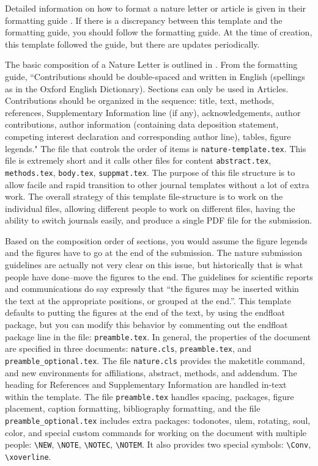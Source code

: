 

Detailed information on how to format a nature letter or article is given in their formatting guide \cite{gta}. If there is a discrepancy between this template and the formatting guide, you should follow the formatting guide. At the time of creation, this template followed the guide, but there are updates periodically. 

The basic composition of a Nature Letter is outlined in \cite{nat_compo}. From the formatting guide\cite{gta}, ``Contributions should be double-spaced and written in English (spellings as in the Oxford English Dictionary). Sections can only be used in Articles. Contributions should be organized in the sequence: title, text, methods, references, Supplementary Information line (if any), acknowledgements, author contributions, author information (containing data deposition statement, competing interest declaration and corresponding author line), tables, figure legends." The file that controls the order of items is \verb!nature-template.tex!. This file is extremely short and it calls other files for content \verb!abstract.tex!, \verb!methods.tex!, \verb!body.tex!, \verb!suppmat.tex!. The purpose of this file structure is to allow facile and rapid transition to other journal templates without a lot of extra work. The overall strategy of this template file-structure is to work on the individual files, allowing different people to work on different files, having the ability to switch journals easily, and produce a single PDF file for the submission.

Based on the composition order of sections, you would assume the figure legends and the figures have to go at the end of the submission. The nature submission guidelines are actually not very clear on this issue, but historically that is what people have done--move the figures to the end. The guidelines for scientific reports\cite{nsreps} and communications\cite{ncomms} do say expressly that ``the figures may be inserted within the text at the appropriate positions, or grouped at the end.''. This template defaults to putting the figures at the end of the text, by using the endfloat package, but you can modify this behavior by commenting out the endfloat package line in the file: \verb!preamble.tex!. In general, the properties of the document are specified in three documents: \verb!nature.cls!, \verb!preamble.tex!, and \verb!preamble_optional.tex!. The file \verb!nature.cls! provides the maketitle command, and new environments for affiliations, abstract, methods, and addendum. The heading for References and Supplementary Information are handled in-text within the template. The file \verb!preamble.tex! handles spacing, packages, figure placement, caption formatting, bibliography formatting, and the file \verb!preamble_optional.tex! includes extra packages: todonotes, ulem, rotating, soul, color, and special custom commands for working on the document with multiple people: \verb!\NEW!, \verb!\NOTE!, \verb!\NOTEC!, \verb!\NOTEM!. It also provides two special symbols: \verb!\Conv!, \verb!\xoverline!. 

